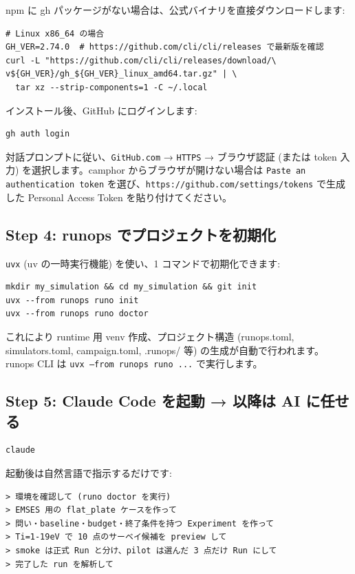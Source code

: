 \documentclass[a4paper,11pt]{article}
\begin{document}
npm に gh パッケージがない場合は、公式バイナリを直接ダウンロードします:

\begin{lstlisting}
# Linux x86_64 の場合
GH_VER=2.74.0  # https://github.com/cli/cli/releases で最新版を確認
curl -L "https://github.com/cli/cli/releases/download/\
v${GH_VER}/gh_${GH_VER}_linux_amd64.tar.gz" | \
  tar xz --strip-components=1 -C ~/.local
\end{lstlisting}

インストール後、GitHub にログインします:

\begin{lstlisting}
gh auth login
\end{lstlisting}

対話プロンプトに従い、\texttt{GitHub.com} → \texttt{HTTPS} → ブラウザ認証 (または token 入力) を選択します。camphor からブラウザが開けない場合は \texttt{Paste an authentication token} を選び、\texttt{https://github.com/settings/tokens} で生成した Personal Access Token を貼り付けてください。

\subsection*{\color{accent} Step 4: runops でプロジェクトを初期化}

\texttt{uvx} (uv の一時実行機能) を使い、1 コマンドで初期化できます:

\begin{lstlisting}
mkdir my_simulation && cd my_simulation && git init
uvx --from runops runo init
uvx --from runops runo doctor
\end{lstlisting}

これにより runtime 用 venv 作成、プロジェクト構造 (runops.toml, simulators.toml, campaign.toml, .runops/ 等) の生成が自動で行われます。runops CLI は \texttt{uvx --from runops runo ...} で実行します。

\subsection*{\color{accent} Step 5: Claude Code を起動 → 以降は AI に任せる}

\begin{lstlisting}
claude
\end{lstlisting}

起動後は自然言語で指示するだけです:

\begin{lstlisting}[language={},commentstyle={}]
> 環境を確認して (runo doctor を実行)
> EMSES 用の flat_plate ケースを作って
> 問い・baseline・budget・終了条件を持つ Experiment を作って
> Ti=1-19eV で 10 点のサーベイ候補を preview して
> smoke は正式 Run と分け、pilot は選んだ 3 点だけ Run にして
> 完了した run を解析して
\end{lstlisting}
\end{document}
